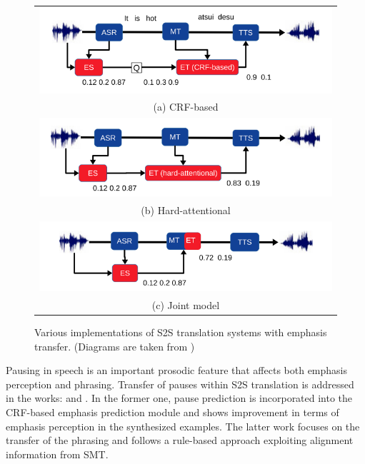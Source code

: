 \begin{figure}
\centering
\begin{tabular}{c}
  \includegraphics[width=0.7\linewidth]{img/quoc_a.png} \\
(a) CRF-based \\[6pt]
 \includegraphics[width=0.7\linewidth]{img/quoc_b.png} \\
(b) Hard-attentional \\[6pt]
 \includegraphics[width=0.7\linewidth]{img/quoc_c.png} \\
(c) Joint model \\[6pt]
\end{tabular}
\caption{Various implementations of S2S translation systems with emphasis transfer. (Diagrams are taken from \cite{Quoc2018}) }
\label{sota:quoc}
\end{figure}

Pausing in speech is an important prosodic feature that affects both emphasis perception and phrasing. Transfer of pauses within S2S translation is addressed in the works: \cite{truong2015_iwslt} and \cite{bonafonte:pausetransfer}. In the former one, pause prediction is incorporated into the CRF-based emphasis prediction module and shows improvement in terms of emphasis perception in the synthesized examples. The latter work focuses on the transfer of the phrasing and follows a rule-based approach exploiting alignment information from SMT. 

